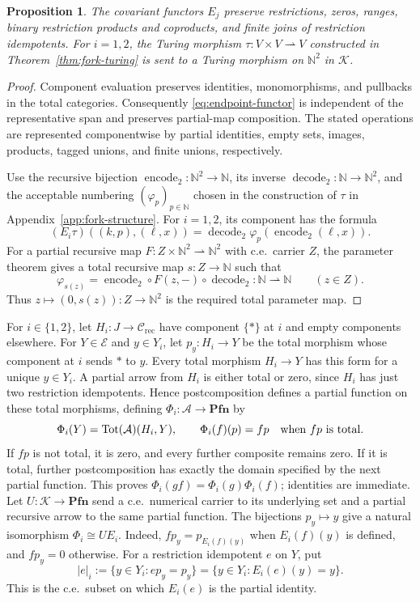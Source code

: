 \documentclass[11pt]{article}
\newtheorem{proposition}[theorem]{Proposition}
\newcommand{\N}{\mathbb N}
\newcommand{\Pfn}{\mathbf{Pfn}}
\begin{document}
\begin{proposition}\label{prop:endpoint}
The covariant functors $E_j$ preserve restrictions, zeros, ranges,
binary restriction products and coproducts, and finite joins of
restriction idempotents.
For $i=1,2$, the Turing morphism
$\tau:V\times V\rightharpoonup V$ constructed in
Theorem~\ref{thm:fork-turing} is sent
to a Turing morphism on $\N^2$ in $\mathcal K$.
\end{proposition}
\begin{proof}
Component evaluation preserves identities, monomorphisms, and
pullbacks in the total categories. Consequently \eqref{eq:endpoint-functor}
is independent of the representative span and preserves partial-map
composition. The stated operations are represented componentwise by
partial identities, empty sets, images, products, tagged unions, and
finite unions, respectively.

Use the recursive bijection $\operatorname{encode}_2:\N^2\to\N$,
its inverse $\operatorname{decode}_2:\N\to\N^2$, and the acceptable numbering
$(\varphi_p)_{p\in\N}$ chosen in the construction of $\tau$ in
Appendix~\ref{app:fork-structure}. For $i=1,2$, its component has
the formula
\[
 (E_i\tau)((k,p),(\ell,x))
 =\operatorname{decode}_2\varphi_p(\operatorname{encode}_2(\ell,x)).
\]
For a partial recursive map
$F:Z\times\N^2\rightharpoonup\N^2$ with c.e.\ carrier $Z$,
the parameter theorem gives a total recursive map $s:Z\to\N$ such that
\[
 \varphi_{s(z)}
 =\operatorname{encode}_2\circ F(z,-)\circ\operatorname{decode}_2
 :\N\rightharpoonup\N
 \qquad(z\in Z).
\]
Thus $z\mapsto(0,s(z)):Z\to\N^2$ is the required total parameter map.
\end{proof}

For $i\in\{1,2\}$, let $H_i:J\to\mathcal C_{\mathrm{rec}}$
have component $\{*\}$ at $i$ and empty components elsewhere.
For $Y\in\mathcal E$ and $y\in Y_i$, let $p_y:H_i\to Y$ be the total morphism
whose component at $i$ sends $*$ to $y$. Every total morphism
$H_i\to Y$ has this form for a unique $y\in Y_i$. A partial
arrow from $H_i$ is either total or zero, since $H_i$ has just
two restriction idempotents. Hence postcomposition defines a partial
function on these total morphisms, defining
$\Phi_i:\mathcal A\to\Pfn$ by
\[
 \Phi_i(Y)=\operatorname{Tot}(\mathcal A)(H_i,Y),\qquad
 \Phi_i(f)(p)=fp\quad\hbox{when }fp\hbox{ is total}.
\]
If $fp$ is not total, it is zero, and every further composite
remains zero. If it is total, further postcomposition has exactly
the domain specified by the next partial function. This proves
$\Phi_i(gf)=\Phi_i(g)\Phi_i(f)$; identities are immediate.
Let $U:\mathcal K\to\Pfn$ send a c.e.\ numerical carrier to its
underlying set and a partial recursive arrow to the same partial
function. The bijections $p_y\mapsto y$ give a natural isomorphism
$\Phi_i\cong U E_i$.
Indeed, $fp_y=p_{E_i(f)(y)}$ when $E_i(f)(y)$ is defined, and $fp_y=0$
otherwise.
For a restriction idempotent $e$ on $Y$, put
\begin{equation}\label{eq:probe-domain}
 |e|_i:=\{y\in Y_i:ep_y=p_y\}
       =\{y\in Y_i:E_i(e)(y)=y\}.
\end{equation}
This is the c.e.\ subset on which $E_i(e)$ is the partial identity.
\end{document}
